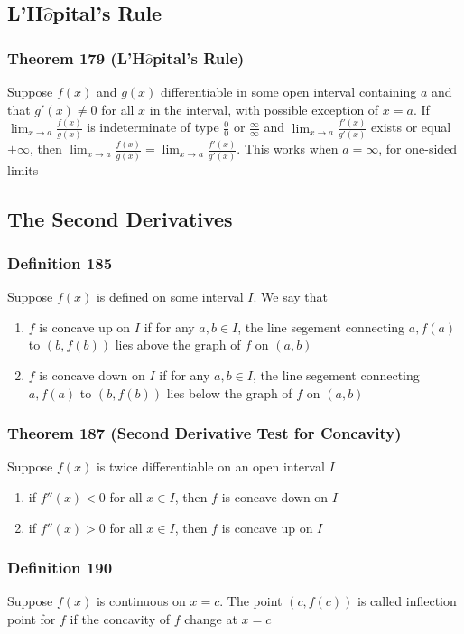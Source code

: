 \documentclass[12pt, letterpaper]{article}
\begin{document}
\subsection{L'H$\hat{o}$pital's Rule}
\subsubsection*{Theorem 179 (L'H$\hat{o}$pital's Rule)}
Suppose $f(x)$ and $g(x)$ differentiable in some open interval containing $a$ and that $g'(x)\neq 0$ for all $x$ in 
the interval, with possible exception of $x=a$. If $\displaystyle\lim_{x\to a}\frac{f(x)}{g(x)}$ is indeterminate of type
$\frac{0}{0}$ or $\frac{\infty}{\infty}$ and $\displaystyle\lim_{x\to a}\frac{f'(x)}{g'(x)}$ exists or equal $\pm\infty$, then 
$\displaystyle\lim_{x\to a}\frac{f(x)}{g(x)} = \displaystyle\lim_{x\to a}\frac{f'(x)}{g'(x)}$. This works when $a=\infty$, for one-sided limits
\subsection{The Second Derivatives}
\subsubsection*{Definition 185}
Suppose $f(x)$ is defined on some interval $I$. We say that
\begin{enumerate}
    \item $f$ is concave up on $I$ if for any $a,b\in I$, the line segement connecting $a,f(a)$ to $(b,f(b))$ lies above the graph of $f$ on $(a,b)$
    \item $f$ is concave down on $I$ if for any $a,b\in I$, the line segement connecting $a,f(a)$ to $(b,f(b))$ lies below the graph of $f$ on $(a,b)$
\end{enumerate}
\subsubsection*{Theorem 187 (Second Derivative Test for Concavity)}
Suppose $f(x)$ is twice differentiable on an open interval $I$
\begin{enumerate}
    \item if $f''(x) < 0$ for all $x\in I$, then $f$ is concave down on $I$
    \item if $f''(x) > 0$ for all $x\in I$, then $f$ is concave up on $I$
\end{enumerate}
\subsubsection*{Definition 190}
Suppose $f(x)$ is continuous on $x=c$. The point $(c,f(c))$ is called inflection point for $f$ if the concavity
of $f$ change at $x=c$
\end{document}
